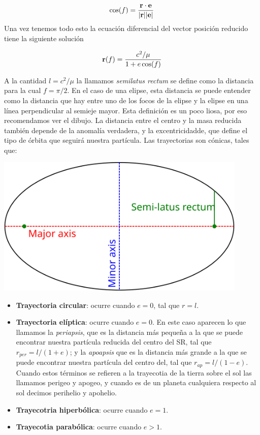 \begin{equation}
    \cos (f) = \frac{\mathbf{r} \cdot \mathbf{e}}{|\mathbf{r}||\mathbf{e}|}
\end{equation}
Una vez tenemos todo esto la ecuación diferencial del vector posición reducido tiene la siguiente solución

\begin{equation}
    \mathbf{r}(f) = \frac{c^2/\mu}{1+e\cos(f)}
\end{equation}
\hspace{-0.0mm} \vspace{1.0mm} \begin{minipage}{0.55\textwidth}  
A  la cantidad $l=c^2/\mu$ la llamamos \textit{semilatus rectum} se define como la distancia para la cual $f=\pi/2$. En el caso de una elipse, esta distancia se puede entender como la distancia que hay entre uno de los focos de la elipse y la elipse en una línea perpendicular al semieje mayor. Esta definición es un poco liosa, por eso recomendamos ver el dibujo. La distancia entre el centro y la masa reducida también depende de la anomalía verdadera, y la excentricidadde, que define el tipo de órbita que seguirá nuestra partícula. Las trayectorias son cónicas, tales que:
\end{minipage}	\hfill
\begin{minipage}{0.47\textwidth} \centering
\includegraphics[width=0.9\textwidth]{Cuerpo/Ch_02/02_Semilatus_rectum.png}	
\end{minipage}	


\begin{itemize}
    \item \textbf{Trayectoria circular}: ocurre cuando $e=0$, tal que $r=l$.
    \item \textbf{Trayectoria elíptica}: ocurre cuando $e=0$. En este caso aparecen lo que llamamos la \textit{periapsis}, que es la distancia más pequeña a la que se puede encontrar nuestra partícula reducida del centro del SR, tal que $r_{per}=l/(1+e)$; y la \textit{apoapsis} que es la distancia más grande a la que se puede encontrar nuestra partícula del centro del, tal que $r_{ap}=l/(1-e)$. Cuando estos términos se refieren a la trayecotia de la tierra sobre el sol las llamamos perigeo y apogeo, y cuando es de un planeta cualquiera respecto al sol decimos perihelio y apohelio.
    \item \textbf{Trayecotria hiperbólica}: ocurre cuando $e=1$. 
    \item \textbf{Trayecotia parabólica}: ocurre cuando $e>1$.
\end{itemize}


